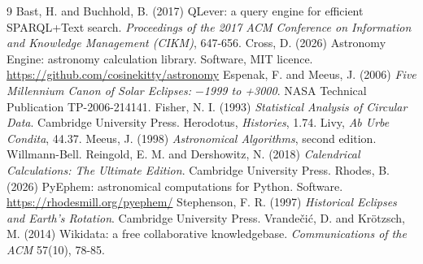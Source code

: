 \documentclass[11pt,a4paper]{article}
\begin{document}
\begin{thebibliography}{9}
 Bast, H. and Buchhold, B. (2017) QLever: a query engine for efficient SPARQL+Text search. \textit{Proceedings of the 2017 ACM Conference on Information and Knowledge Management (CIKM)}, 647-656.
 Cross, D. (2026) Astronomy Engine: astronomy calculation library. Software, MIT licence. \url{https://github.com/cosinekitty/astronomy}
 Espenak, F. and Meeus, J. (2006) \textit{Five Millennium Canon of Solar Eclipses: $-$1999 to +3000}. NASA Technical Publication TP-2006-214141.
 Fisher, N. I. (1993) \textit{Statistical Analysis of Circular Data}. Cambridge University Press.
 Herodotus, \textit{Histories}, 1.74.
 Livy, \textit{Ab Urbe Condita}, 44.37.
 Meeus, J. (1998) \textit{Astronomical Algorithms}, second edition. Willmann-Bell.
 Reingold, E. M. and Dershowitz, N. (2018) \textit{Calendrical Calculations: The Ultimate Edition}. Cambridge University Press.
 Rhodes, B. (2026) PyEphem: astronomical computations for Python. Software. \url{https://rhodesmill.org/pyephem/}
 Stephenson, F. R. (1997) \textit{Historical Eclipses and Earth's Rotation}. Cambridge University Press.
 Vrande\v{c}i\'{c}, D. and Kr\"{o}tzsch, M. (2014) Wikidata: a free collaborative knowledgebase. \textit{Communications of the ACM} 57(10), 78-85.
\end{thebibliography}
\end{document}
